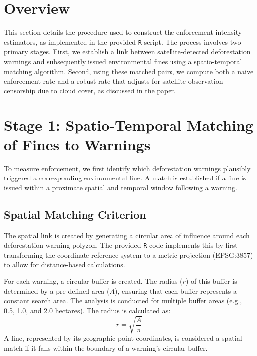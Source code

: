 \documentclass[12pt]{article}
\begin{document}
\begin{appendices}
\begin{table}[ht]
{}
\end{table}

\pagebreak


\fi 


\section*{Overview}
This section details the procedure used to construct the enforcement intensity estimators, as implemented in the provided \texttt{R} script. The process involves two primary stages. First, we establish a link between satellite-detected deforestation warnings and subsequently issued environmental fines using a spatio-temporal matching algorithm. Second, using these matched pairs, we compute both a naive enforcement rate and a robust rate that adjusts for satellite observation censorship due to cloud cover, as discussed in the paper.

\section*{Stage 1: Spatio-Temporal Matching of Fines to Warnings}
To measure enforcement, we first identify which deforestation warnings plausibly triggered a corresponding environmental fine. A match is established if a fine is issued within a proximate spatial and temporal window following a warning.

\subsection*{Spatial Matching Criterion}
The spatial link is created by generating a circular area of influence around each deforestation warning polygon. The provided \texttt{R} code implements this by first transforming the coordinate reference system to a metric projection (EPSG:3857) to allow for distance-based calculations.

For each warning, a circular buffer is created. The radius ($r$) of this buffer is determined by a pre-defined area ($A$), ensuring that each buffer represents a constant search area. The analysis is conducted for multiple buffer areas (e.g., 0.5, 1.0, and 2.0 hectares). The radius is calculated as:
$$
r = \sqrt{\frac{A}{\pi}}
$$
A fine, represented by its geographic point coordinates, is considered a spatial match if it falls within the boundary of a warning's circular buffer.


\end{appendices}
\end{document}
